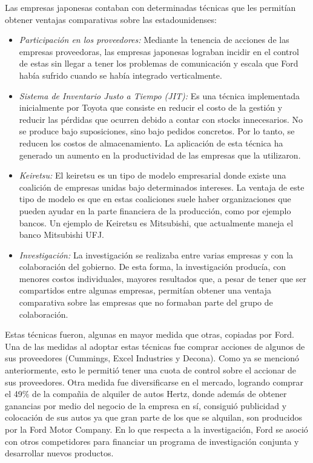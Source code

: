 		Las empresas japonesas contaban con determinadas t\'ecnicas que les permitían obtener ventajas comparativas sobre las estadounidenses:
		\begin{itemize}
			\item{\emph{Participaci\'on en los proveedores:}}
				Mediante la tenencia de acciones de las empresas proveedoras, las empresas japonesas lograban incidir en el control de estas sin llegar a tener los problemas de comunicaci\'on y escala que Ford había sufrido cuando se había integrado verticalmente.

			\item{\emph{Sistema de Inventario Justo a Tiempo (JIT):}}
				Es una t\'ecnica implementada inicialmente por Toyota que consiste en reducir el costo de la gesti\'on y reducir las p\'erdidas que ocurren debido a contar con stocks innecesarios.
				No se produce bajo suposiciones, sino bajo pedidos concretos.
				Por lo tanto, se reducen los costos de almacenamiento.
				La aplicaci\'on de esta t\'ecnica ha generado un aumento en la productividad de las empresas que la utilizaron.

			\item{\emph{Keiretsu:}}
				El keiretsu es un tipo de modelo empresarial donde existe una coalici\'on de empresas unidas bajo determinados intereses.
				La ventaja de este tipo de modelo es que en estas coaliciones suele haber organizaciones que pueden ayudar en la parte financiera de la producci\'on, como por ejemplo bancos.
				Un ejemplo de Keiretsu es Mitsubishi, que actualmente maneja el banco Mitsubishi UFJ.

			\item{\emph{Investigaci\'on:}}
				La investigaci\'on se realizaba entre varias empresas y con la colaboraci\'on del gobierno.
				De esta forma, la investigaci\'on producía, con menores costos individuales, mayores resultados que, a pesar de tener que ser compartidos entre algunas empresas, permitían obtener una ventaja comparativa sobre las empresas que no formaban parte del grupo de colaboraci\'on.

		\end{itemize}

		Estas t\'ecnicas fueron, algunas en mayor medida que otras, copiadas por Ford.
		Una de las medidas al adoptar estas t\'ecnicas fue comprar acciones de algunos de sus proveedores (Cummings, Excel Industries y Decona).
		Como ya se mencion\'o anteriormente, esto le permiti\'o tener una cuota de control sobre el accionar de sus proveedores.
		Otra medida fue diversificarse en el mercado, logrando comprar el 49$\%$ de la compa\~nia de alquiler de autos Hertz, donde adem\'as de obtener ganancias por medio del negocio de la empresa en sí, consigui\'o publicidad y colocaci\'on de sus autos ya que gran parte de los que se alquilan, son producidos por la Ford Motor Company.
		En lo que respecta a la investigaci\'on, Ford se asoci\'o con otros competidores para financiar un programa de investigaci\'on conjunta y desarrollar nuevos productos.

